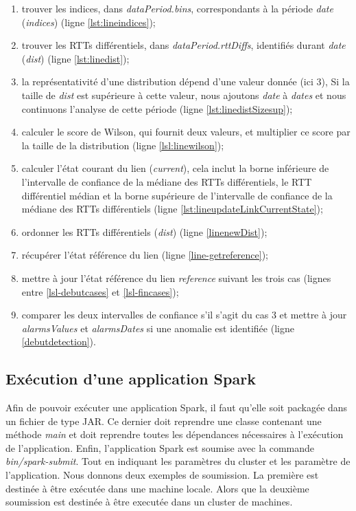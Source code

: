  \begin{enumerate}
 	\item trouver les indices,  dans \textit{dataPeriod.bins}, correspondants à la période \textit{date} (\textit{indices}) (ligne \ref{lst:lineindices});
 	
 	\item trouver les RTTs différentiels, dans \textit{dataPeriod.rttDiffs}, identifiés durant  \textit{date} (\textit{dist}) (ligne \ref{lst:linedist});
 	
 	\item la représentativité d'une distribution dépend d'une valeur donnée  (ici $3$), Si la taille de \textit{dist} est supérieure à cette valeur, nous ajoutons \textit{date} à \textit{dates} et nous continuons l'analyse de cette période (ligne \ref{lst:linedistSizesup});
 	\item calculer le score de Wilson, qui fournit deux valeurs, et multiplier ce score par la taille de la distribution  (ligne \ref{lsl:linewilson});
 	\item calculer l'état courant du lien (\textit{current}), cela inclut la borne inférieure de l'intervalle de confiance de la médiane des RTTs différentiels, le RTT différentiel médian et la borne supérieure de l'intervalle de confiance de la médiane des RTTs différentiels (ligne \ref{lst:lineupdateLinkCurrentState});
 	\item ordonner les RTTs différentiels (\textit{dist}) (ligne \ref{linenewDist});
 	\item récupérer l'état référence du lien (ligne \ref{line-getreference});
 	\item mettre à jour l'état référence du lien \textit{reference} suivant les trois cas (lignes entre \ref{lsl-debutcases} et \ref{lsl-fincases});
 	\item  comparer les deux intervalles de confiance s'il s'agit du cas $3$ et mettre à jour \textit{alarmsValues} et \textit{alarmsDates} si une anomalie est identifiée (ligne \ref{debutdetection}).
 	
 \end{enumerate}



\subsection{Exécution d'une application Spark} 

Afin de pouvoir exécuter une application Spark, il faut qu'elle soit packagée dans un fichier de type JAR. Ce dernier doit reprendre une classe contenant une méthode \textit{main} et doit reprendre toutes les dépendances nécessaires à l'exécution de l'application.  Enfin, l'application Spark  est soumise avec la commande \textit{bin/spark-submit}. Tout en indiquant les paramètres du cluster et les paramètre de l'application. Nous donnons deux exemples de soumission. La première est destinée à être exécutée dans une machine locale. Alors que la deuxième soumission est destinée à être executée dans un cluster de machines. 

